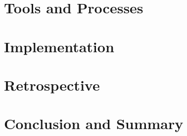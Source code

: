 \documentclass{clbthesis}
\begin{document}
\chapter{Tools and Processes}					


\chapter{Implementation}						


\chapter{Retrospective} 			


\chapter{Conclusion and Summary}				




\cleardoublepage
{}
{}\listoffigures

\listoftables


\appendix



% 
\end{document}
